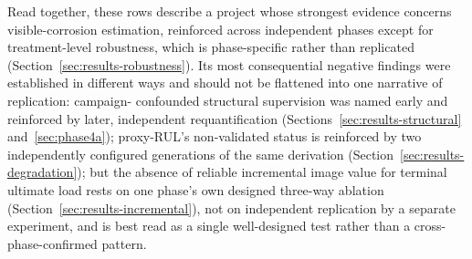 \FloatBarrier

Read together, these rows describe a project whose strongest evidence
concerns visible-corrosion estimation, reinforced across independent
phases except for treatment-level robustness, which is phase-specific
rather than replicated (Section~\ref{sec:results-robustness}). Its most
consequential negative findings were established in different ways and
should not be flattened into one narrative of replication: campaign-
confounded structural supervision was named early and reinforced by later,
independent requantification (Sections~\ref{sec:results-structural}
and~\ref{sec:phase4a}); proxy-RUL's non-validated status is reinforced by
two independently configured generations of the same derivation
(Section~\ref{sec:results-degradation}); but the absence of reliable
incremental image value for terminal ultimate load rests on one phase's
own designed three-way ablation
(Section~\ref{sec:results-incremental}), not on independent replication by
a separate experiment, and is best read as a single well-designed test
rather than a cross-phase-confirmed pattern.
